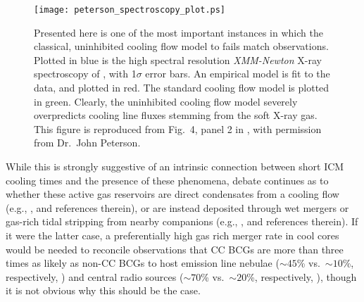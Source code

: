 \begin{figure}
\begin{center}
\texttt{[image: peterson\_spectroscopy\_plot.ps]}
\end{center}
\caption[One instance in which the uninhibited cooling flow model fails to match observations]{Presented here is one of the
most important instances in which the classical, uninhibited cooling flow model to fails match observations. Plotted in blue is the high spectral resolution 
{\it XMM-Newton} X-ray spectroscopy of \citet{peterson03}, with 
 1$\sigma$ error bars. An empirical model is fit to the data, and plotted 
in red. The standard cooling flow model is plotted in green. Clearly, 
the uninhibited cooling flow model severely 
overpredicts cooling line fluxes stemming from the soft X-ray gas. 
This figure is reproduced from Fig.~4, panel 2 in \citet{peterson03}, with permission from Dr.~John Peterson. }
\label{fig:intro_petersonspec}
\end{figure}





While this  is strongly suggestive of an  intrinsic connection between
short  ICM cooling  times  and  the presence  of  these phenomena,  
debate continues as to whether these  active  gas
reservoirs    are   direct   condensates    from   a    cooling   flow (e.g., \citealt{odea08}, and references therein), or are  instead deposited through wet mergers
or    gas-rich     tidal    stripping    from     nearby    companions
(e.g., \citealt{sparks89,holtzman96}, and references therein).
If it were the latter case,  a preferentially high gas rich merger rate in cool
cores would be needed to  
reconcile observations that CC BCGs are more than three times as  likely as non-CC BCGs  to host emission  line nebulae ($\sim
45$\%             vs.~$\sim            10$\%,            respectively,
\citealt{crawford99,best06,edwards07}) and central radio sources 
($\sim 70$\% vs.~$\sim  20$\%, respectively,
\citealt{burns90}), though  it is not  obvious why this should  be the
case.





